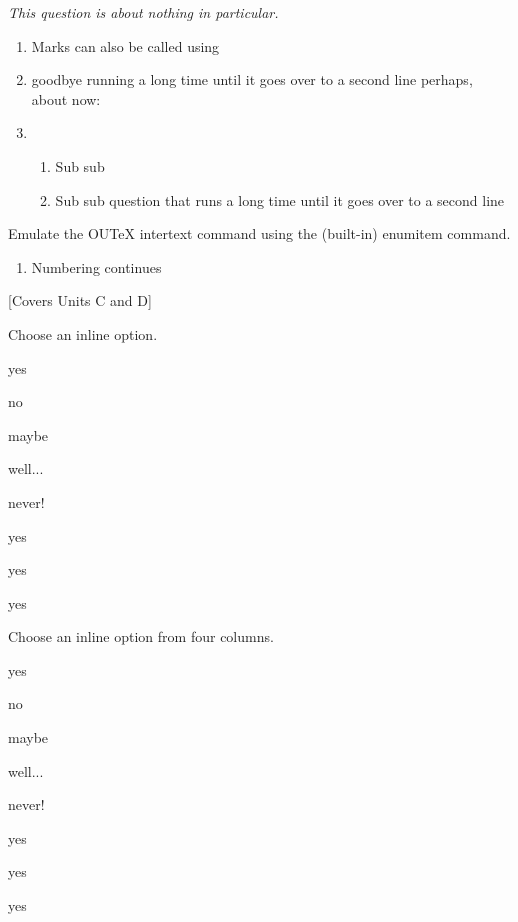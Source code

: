 \documentclass{ouab}
\begin{document}
\emph{This question is about nothing in particular.}
\begin{enumerate}
\item Marks can also be called using 
\item goodbye running a long time until it goes over to a second line perhaps, about now:
\item 
\begin{enumerate}
\item Sub sub
\item Sub sub question that runs a long time until it goes over to a second line
\end{enumerate}
\end{enumerate}
Emulate the OUTeX intertext command using the (built-in) enumitem command.
\begin{enumerate}[resume]
\item Numbering continues
\end{enumerate}


[Covers Units C and D]

Choose an inline option.

\begin{inlineoptions}{5} %
\item yes
\item no
\item maybe
\item well...
\item never!
\item yes
\item yes
\item yes
\noitem %
\noitem
\end{inlineoptions}

Choose an inline option from four columns.

\begin{inlineoptions}{4} %
\item yes
\item no
\item maybe
\item well...
\item never!
\item yes
\item yes
\item yes
\end{inlineoptions}
\end{document}
